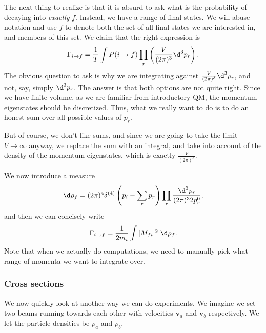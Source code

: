 \documentclass[a4paper]{article}
\begin{document}
The next thing to realize is that it is absurd to ask what is the probability of decaying into \emph{exactly} $f$. Instead, we have a range of final states. We will abuse notation and use $f$ to denote both the set of all final states we are interested in, and members of this set. We claim that the right expression is
\[
  \Gamma_{i \to f} = \frac{1}{T} \int P(i \to f) \prod_r \left(\frac{V}{(2\pi)^3}\d^3 p_r\right).
\]
The obvious question to ask is why we are integrating against $\frac{V}{(2\pi)^3} \d^3 p_r$, and not, say, simply $\d^3 p_r$. The answer is that both options are not quite right. Since we have finite volume, as we are familiar from introductory QM, the momentum eigenstates should be discretized. Thus, what we really want to do is to do an honest sum over all possible values of $p_r$.

But of course, we don't like sums, and since we are going to take the limit $V \to \infty$ anyway, we replace the sum with an integral, and take into account of the density of the momentum eigenstates, which is exactly $\frac{V}{(2\pi)^3}$.

We now introduce a measure
\[
  \d \rho_f = (2\pi)^4 \delta^{(4)}\left(p_i - \sum_r p_r\right) \prod_r \frac{\d^3 p_r}{(2\pi)^3 2 p_r^0},
\]
and then we can concisely write
\[
  \Gamma_{i \to f} = \frac{1}{2 m_i} \int |M_{fi}|^2 \;\d \rho_f.
\]
Note that when we actually do computations, we need to manually pick what range of momenta we want to integrate over.

%

\subsubsection*{Cross sections}
We now quickly look at another way we can do experiments. We imagine we set two beams running towards each other with velocities $\mathbf{v}_a$ and $\mathbf{v}_b$ respectively. We let the particle densities be $\rho_a$ and $\rho_b$.
\end{document}
